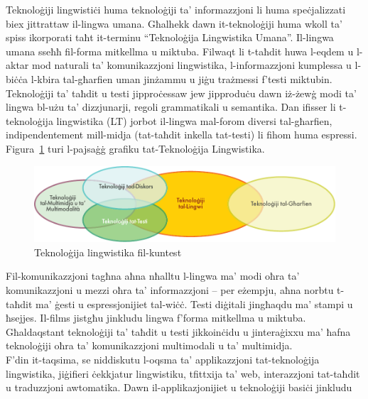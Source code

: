 \documentclass[]{../../metanetpaper}
\begin{document}


\begin{multicols}{2}

Teknoloġiji lingwistiċi huma teknoloġiji ta’ informazzjoni li huma speċjalizzati biex jittrattaw il-lingwa umana. Għalhekk dawn it-teknoloġiji huma wkoll ta’ spiss ikorporati taħt it-terminu “Teknoloġija Lingwistika Umana”. Il-lingwa umana sseħħ fil-forma mitkellma u miktuba. Filwaqt li t-taħdit huwa l-eqdem u l-aktar mod naturali ta’ komunikazzjoni lingwistika, l-informazzjoni kumplessa u l-biċċa l-kbira tal-għarfien uman jinżammu u jiġu trażmessi f’testi miktubin. Teknoloġiji ta’ taħdit u testi jipproċessaw jew jipproduċu dawn iż-żewġ modi ta’ lingwa bl-użu ta’ dizzjunarji, regoli grammatikali u semantika. Dan ifisser li t-teknoloġija lingwistika (LT) jorbot il-lingwa mal-forom diversi tal-għarfien, indipendentement mill-midja (tat-taħdit inkella tat-testi) li fihom huma espressi. Figura~\ref{fig:ltincontext_mt} turi l-pajsaġġ grafiku tat-Teknoloġija Lingwistika. 

 \begin{figure}[htb]
  \center
  \includegraphics[width=\textwidth]{../_media/maltese/language_technologies}
  \caption{Teknoloġija lingwistika fil-kuntest}
  \label{fig:ltincontext_mt}
\end{figure}


Fil-komunikazzjoni tagħna aħna nħalltu l-lingwa ma’ modi oħra ta’ komunikazzjoni u mezzi oħra ta’ informazzjoni – per eżempju, aħna norbtu t-taħdit ma’ ġesti u espressjonijiet tal-wiċċ. Testi diġitali jingħaqdu ma’ stampi u ħsejjes. Il-films jistgħu jinkludu lingwa f’forma mitkellma u miktuba. Għaldaqstant teknoloġiji ta’ taħdit u testi jikkoinċidu u jinteraġixxu ma’ ħafna teknoloġiji oħra ta’ komunikazzjoni multimodali u ta' multimidja.\\
F'din it-taqsima, se niddiskutu l-oqsma ta' applikazzjoni tat-teknoloġija lingwistika, jiġifieri ċekkjatur lingwistiku, tfittxija ta' web, interazzjoni tat-taħdit u traduzzjoni awtomatika. Dawn il-applikazjonijiet u teknoloġiji basiċi jinkludu


\end{multicols}
\end{document}
